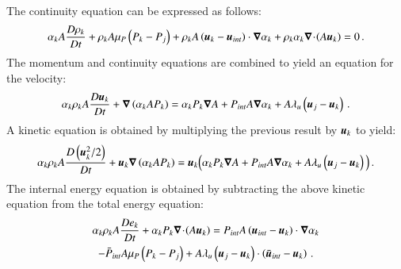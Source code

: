 \documentclass[preprint,10pt]{elsarticle}
\begin{document}
\begin{appendices}
The continuity equation can be expressed as follows:
\begin{equation}
\label{eq:cont1-app}
\alpha_k A \frac{D \rho_k}{Dt} + \rho_k A \mu_P \left( P_k-P_j \right) + \rho_k A \left( \boldsymbol u_k-\boldsymbol u_{int} \right) \cdot \boldsymbol\nabla \alpha_k + \rho_k \alpha_k \boldsymbol\nabla\! \cdot \! \left( A \boldsymbol u_k \right) = 0 \,.
\end{equation}
The momentum and continuity equations are combined to yield an equation for the velocity:
\begin{equation}
\label{eq:vel1-app}
\alpha_k \rho_k A \frac{D\boldsymbol u_k}{Dt} + \boldsymbol\nabla \left( \alpha_k A P_k \right) = \alpha_k P_k \boldsymbol\nabla A + P_{int} A \boldsymbol\nabla \alpha_k + A \lambda_u \left( \boldsymbol u_j-\boldsymbol u_k \right) \,.
\end{equation}
A kinetic equation is obtained by multiplying the previous result by $\boldsymbol u_k$ to yield:
\begin{equation}
\label{eq:kin1-app}
\alpha_k \rho_k A \frac{D\left(\boldsymbol u_k^2/2\right)}{Dt} + \boldsymbol u_k \boldsymbol\nabla \left( \alpha_k A P_k \right) = \boldsymbol u_k  \Big( \alpha_k P_k \boldsymbol\nabla A + P_{int} A \boldsymbol\nabla \alpha_k + A \lambda_u \left( \boldsymbol u_j-\boldsymbol u_k \right) \Big) \,.
\end{equation}
%
The internal energy equation is obtained by subtracting the above kinetic equation from the total energy equation:
\begin{multline}\label{eq:internal1}
\alpha_k \rho_k A \frac{D e_k}{Dt} + \alpha_k P_k \boldsymbol\nabla\! \cdot \! \left(A \boldsymbol u_k \right) = 
 P_{int} A \left(\boldsymbol u_{int}-\boldsymbol u_k \right) \cdot \boldsymbol\nabla \alpha_k \\
 - \bar{P}_{int} A \mu_P \left(P_k-P_j \right) + A \lambda_u \left(\boldsymbol u_j-\boldsymbol u_k  \right) \cdot \left(\bar{\boldsymbol u}_{int}-\boldsymbol u_k \right) \,.
\end{multline}



\end{appendices}
\end{document}
